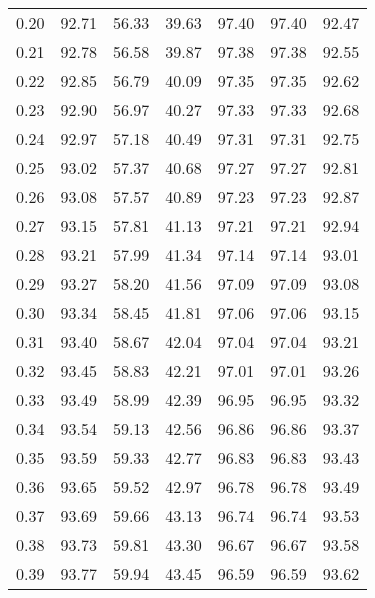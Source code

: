 \begin{tabular}{|c|c|c|c|c|c|c|}
      0.20 &     92.71 &     56.33 &      39.63 &   97.40 &      97.40 &         92.47 \\
      0.21 &     92.78 &     56.58 &      39.87 &   97.38 &      97.38 &         92.55 \\
      0.22 &     92.85 &     56.79 &      40.09 &   97.35 &      97.35 &         92.62 \\
      0.23 &     92.90 &     56.97 &      40.27 &   97.33 &      97.33 &         92.68 \\
      0.24 &     92.97 &     57.18 &      40.49 &   97.31 &      97.31 &         92.75 \\
      0.25 &     93.02 &     57.37 &      40.68 &   97.27 &      97.27 &         92.81 \\
      0.26 &     93.08 &     57.57 &      40.89 &   97.23 &      97.23 &         92.87 \\
      0.27 &     93.15 &     57.81 &      41.13 &   97.21 &      97.21 &         92.94 \\
      0.28 &     93.21 &     57.99 &      41.34 &   97.14 &      97.14 &         93.01 \\
      0.29 &     93.27 &     58.20 &      41.56 &   97.09 &      97.09 &         93.08 \\
      0.30 &     93.34 &     58.45 &      41.81 &   97.06 &      97.06 &         93.15 \\
      0.31 &     93.40 &     58.67 &      42.04 &   97.04 &      97.04 &         93.21 \\
      0.32 &     93.45 &     58.83 &      42.21 &   97.01 &      97.01 &         93.26 \\
      0.33 &     93.49 &     58.99 &      42.39 &   96.95 &      96.95 &         93.32 \\
      0.34 &     93.54 &     59.13 &      42.56 &   96.86 &      96.86 &         93.37 \\
      0.35 &     93.59 &     59.33 &      42.77 &   96.83 &      96.83 &         93.43 \\
      0.36 &     93.65 &     59.52 &      42.97 &   96.78 &      96.78 &         93.49 \\
      0.37 &     93.69 &     59.66 &      43.13 &   96.74 &      96.74 &         93.53 \\
      0.38 &     93.73 &     59.81 &      43.30 &   96.67 &      96.67 &         93.58 \\
      0.39 &     93.77 &     59.94 &      43.45 &   96.59 &      96.59 &         93.62 \\

\end{tabular}
